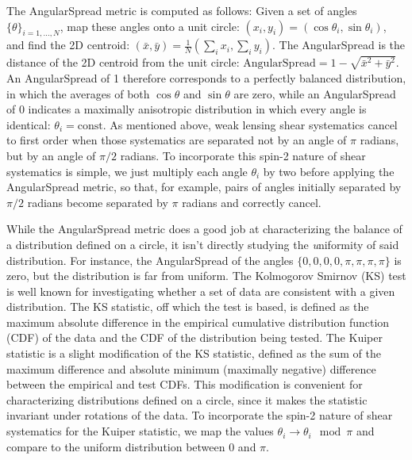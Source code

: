 The AngularSpread metric is computed as follows:  Given a set of angles $\{\theta\}_{i=1, ..., N}$,
map these angles onto a unit circle: $(x_i, y_i) = (\cos \theta_i, \sin \theta_i)$, and find the 2D
centroid: $(\bar{x}, \bar{y}) = \frac{1}{N} (\sum_i x_i, \sum_i y_i)$.  The AngularSpread is the
distance of the 2D centroid from the unit circle:
$\mathrm{AngularSpread} = 1 - \sqrt{\bar{x}^2 + \bar{y}^2}$.  An AngularSpread of 1 therefore
corresponds to a perfectly balanced distribution, in which the averages of both $\cos \theta$ and
$\sin \theta$ are zero, while an AngularSpread of 0 indicates a maximally anisotropic distribution
in which every angle is identical: $\theta_i = \mathrm{const}$.  As mentioned above, weak lensing
shear systematics cancel to first order when those systematics are separated not by an angle of
$\pi$ radians, but by an angle of $\pi/2$ radians.  To incorporate this spin-2 nature of shear
systematics is simple, we just multiply each angle $\theta_i$ by two before applying the
AngularSpread metric, so that, for example, pairs of angles initially separated by $\pi/2$ radians
become separated by $\pi$ radians and correctly cancel.

While the AngularSpread metric does a good job at characterizing the balance of a distribution
defined on a circle, it isn't directly studying the {\emph uniformity} of said distribution.  For
instance, the AngularSpread of the angles $\{0, 0, 0, 0, \pi, \pi, \pi, \pi\}$ is zero, but the
distribution is far from uniform.  The Kolmogorov Smirnov (KS) test is well known for investigating
whether a set of data are consistent with a given distribution.  The KS statistic, off which the
test is based, is defined as the maximum absolute difference in the empirical cumulative
distribution function (CDF) of the data and the CDF of the distribution being tested.  The Kuiper
statistic is a slight modification of the KS statistic, defined as the sum of the maximum difference
and absolute minimum (maximally negative) difference between the empirical and test CDFs.  This
modification is convenient for characterizing distributions defined on a circle, since it makes the
statistic invariant under rotations of the data.  To incorporate the spin-2 nature of shear
systematics for the Kuiper statistic, we map the values $\theta_i \rightarrow \theta_i \mod \pi$ and
compare to the uniform distribution between 0 and $\pi$.

%
%
%


